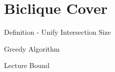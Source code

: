 \section{Biclique Cover}
\label{sec:biclique}

Definition - Unify Intersection Size

Greedy Algorithm



Lecture Bound
